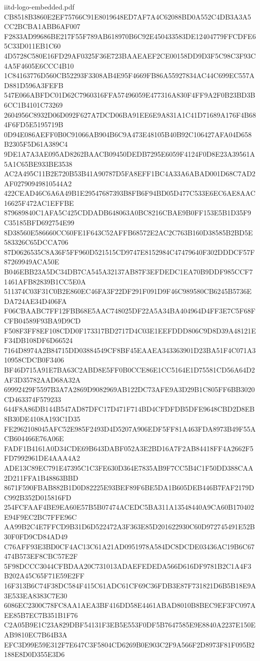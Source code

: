 \begin{filecontents*}[overwrite]{iitd-logo-embedded.pdf}
CB8518B3860E2EF75766C91E8019648ED7AF7A4C62088BD0A552C4DB3A3A5CC2BCBA1ABB6AF007
F2833AD99686BE217F55F789AB618970B6C92E450433583DE12404779FFCDFE65C33D011EB1C60
4D5728C580E16FD29AF0325F36E723BAAEAEF2CE00158DD9D3F5C98C3F93C4A5F4605E6CCC4B10
1C84163776D560CB52293F3308AB4E95F4669FB86A55927834AC44C699EC557AD881D596A3FEFB
547E066ABFDC01D62C7960316FFA57496059E477316A830F4FF9A2F0B23BD3B6CC1B4101C73269
2604956C8932D06D092F627A7DCD06BA91EE6E9A831A1C41D71689A176F4B684F6FD5E5195719B
0D94E086AEFF0B0C91066AB904B6C9A473E48105B40B92C106427AFA04D658B2305F5D61A389C4
9DE1A7A3AE095AD8262BAACB09450DEDB7295E6059F4124F0D8E23A39561A5A1C65BE933BE3538
AC2A495C11B2E720B53B41A90787D5FA8EFF1BC4A33A6ABAD001D68C7AD2AF02790949810544A2
422CEAD46C6A6A49B1E29547687393B8FB6F94BD05D477C533E6EC6AE8AAC16625F472AC1EFFBE
879689840C1AFA5C425CDDADB648063A0BC8216CBAE9B0FF153E5B1D35F9C35185BFD692754E99
8D38560E586660CC60FE1F643C52AFFB68572E2AC2C763B160D38585B2BD5E583326C65DCCA706
87D0626535C8A36F5FF960D521515CD9747E8152984C47479640F302DDDCF57F87269949ACA50E
B046EBB23A5DC34DB7CA545A32137AB87F3EFDEDC1EA70B9DDF985CCF71461AFB82839B1CC5E0A
511374C03F31C0B2E860EC46FA3F22DF291F091D9F46C989580CB6245B5736EDA724AE34D406FA
F06CBAABC7FF12FBB68E5AAC748025DF22A5A34BA404964D4FF3E7C5F68FCFB04589F93BA9D9CD
F508F3FF8EF108CDD0F173317BD2717D4C03E1EEFDDD806C9D8D39A48121EF34DB108DF6D66524
7164D8974A2B84715DD03884549CF8BF45EAAEA343363901D23BA51F4C071A310958CDCB0F3406
BF46D715A91E7BA63C2ABD8E5FF0B0CCE86E1CC5164E1D75581CD56A64D2AF3D35782AAD68A32A
69992429F5597B3A7A2869D9082969AB122DC73AFE9A3D29B1C805FF6BB3020CD463374F579233
644F8A86DB144B547AD87DFC17D471F714BD4CFDFDB5DFE9648CBD2D8EB8B30DE4108A193C1D35
FE2962108045AFC52E985F2493D4D5207A906EDF5FF81A463FDA8973B49F55ACB604466E76A06E
FADF1B4161A0D34CDE69B643DABF052A3E2BD16A7F2AB84418FF4A2662F5FD7992961DE4AAA4A2
ADE13C89EC791E47395C1C3FE630D364E7835AB9F7CC5B4C1F50DD388CAA2D211FFA1B48863BBD
8671F590FBAB882B1D0D82225E93BEF89F6BE5DA1B605DEB446B7FAF2179DC992B352D015816FD
254FCFAAF4BE9EA60E57B5B07474ACEDC5BA311A13548440A9CA60B170402E94F9EC2BC7FFE96C
AA99B2C4E7FFCD9B31D6D522472A3F363E85D201622930C60D972745491E52B30F0FD9CD84AD49
C76AFF93E3BD0CF4AC13C61A21AD0951978A584DC8DCDE03436AC19B6C67474B573EF8CBC57E2F
5F98DCCC3044CFBDAA20C731013ADAEFEDEDA566D616DF9781B2C1A4F3B202A45C65F71E59E2FF
16F313B6C74F38DC584F415C61ADC61CF69C36FDB3E87F731821D6B5B18E9A3E533EA8383C7E30
6086EC2300C78FC8AA1AEA3BF416DD58E4461ABAD8010B8BEC9EF3FC097AEE85B7EC7B351B1F76
C2A05B9E1C23A829DBF54131F3EB5E553F0DF5B7647585E9E8840A2237E150EAB9810EC7B64B3A
EFC3D99E59E312F7E647C3F5804CD6269B0E903C2F9A566F2D8973F81F095B2188E8D0D355E3D6

\end{filecontents*}
